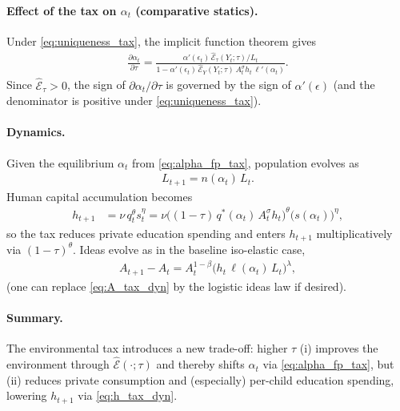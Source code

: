 \documentclass[11pt]{article}
\begin{document}
\paragraph{Effect of the tax on $\alpha_t$ (comparative statics).}
Under \eqref{eq:uniqueness_tax}, the implicit function theorem gives
\begin{align}
\frac{\partial \alpha_t}{\partial \tau}
=
\frac{\alpha'(\epsilon_t)\,\widehat{\mathcal{E}}_\tau(Y_t;\tau)/L_t}
{1-\alpha'(\epsilon_t)\,\widehat{\mathcal{E}}_Y(Y_t;\tau)\,A_t^\sigma h_t\,\ell'(\alpha_t)}.
\label{eq:dalpha_dtau}
\end{align}
Since $\widehat{\mathcal{E}}_\tau>0$, the sign of $\partial\alpha_t/\partial\tau$ is governed by the sign of $\alpha'(\epsilon)$
(and the denominator is positive under \eqref{eq:uniqueness_tax}).

\paragraph{Dynamics.}
Given the equilibrium $\alpha_t$ from \eqref{eq:alpha_fp_tax}, population evolves as
\begin{align}
L_{t+1}=n(\alpha_t)\,L_t.
\label{eq:L_tax_dyn}
\end{align}
Human capital accumulation becomes
\begin{align}
h_{t+1}
&=\nu\,q_t^\theta s_t^\eta
=\nu\Big((1-\tau)\,q^\ast(\alpha_t)\,A_t^\sigma h_t\Big)^\theta \Big(s(\alpha_t)\Big)^\eta,
\label{eq:h_tax_dyn}
\end{align}
so the tax reduces private education spending and enters $h_{t+1}$ multiplicatively via $(1-\tau)^\theta$.
Ideas evolve as in the baseline iso-elastic case,
\begin{align}
A_{t+1}-A_t = A_t^{1-\beta}\Big(h_t\,\ell(\alpha_t)\,L_t\Big)^\lambda,
\label{eq:A_tax_dyn}
\end{align}
(one can replace \eqref{eq:A_tax_dyn} by the logistic ideas law if desired).

\paragraph{Summary.}
The environmental tax introduces a new trade-off:
higher $\tau$ (i) improves the environment through $\widehat{\mathcal{E}}(\cdot;\tau)$ and thereby shifts $\alpha_t$ via \eqref{eq:alpha_fp_tax},
but (ii) reduces private consumption and (especially) per-child education spending, lowering $h_{t+1}$ via \eqref{eq:h_tax_dyn}.
\end{document}
